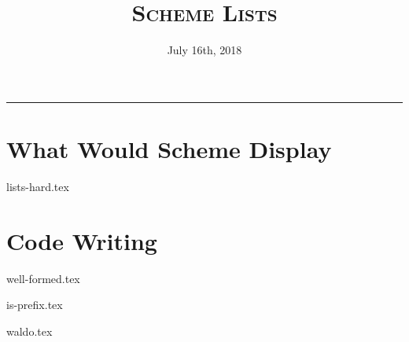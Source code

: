 \documentclass{exam}
\title{\textsc{Scheme Lists}}
\date{July 16th, 2018}
\begin{document}
\maketitle
\rule{\textwidth}{0.15em}
\fontsize{12}{15}\selectfont


\begin{questions}

\section{What Would Scheme Display}
{lists-hard.tex}


\section{Code Writing}

{well-formed.tex}

{is-prefix.tex}

{waldo.tex}

\end{questions}


\end{document}
